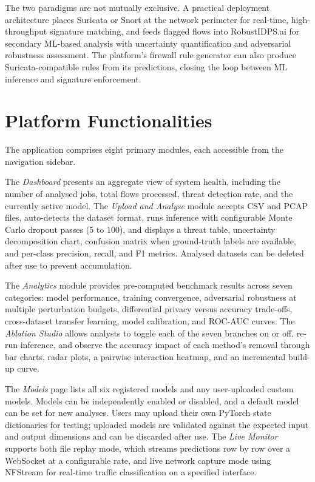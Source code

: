 \documentclass[11pt,a4paper]{article}
\begin{document}
The two paradigms are not mutually exclusive. A practical deployment
architecture places Suricata or Snort at the network perimeter for
real-time, high-throughput signature matching, and feeds flagged flows
into RobustIDPS.ai for secondary ML-based analysis with uncertainty
quantification and adversarial robustness assessment. The platform's
firewall rule generator can also produce Suricata-compatible rules from
its predictions, closing the loop between ML inference and signature
enforcement.

\section{Platform Functionalities}

The application comprises eight primary modules, each accessible from the
navigation sidebar.

The \textit{Dashboard} presents an aggregate view of system health,
including the number of analysed jobs, total flows processed, threat
detection rate, and the currently active model. The \textit{Upload and
Analyse} module accepts CSV and PCAP files, auto-detects the dataset
format, runs inference with configurable Monte Carlo dropout passes (5 to
100), and displays a threat table, uncertainty decomposition chart,
confusion matrix when ground-truth labels are available, and per-class
precision, recall, and F1 metrics. Analysed datasets can be deleted after
use to prevent accumulation.

The \textit{Analytics} module provides pre-computed benchmark results
across seven categories: model performance, training convergence,
adversarial robustness at multiple perturbation budgets, differential
privacy versus accuracy trade-offs, cross-dataset transfer learning, model
calibration, and ROC-AUC curves. The \textit{Ablation Studio} allows
analysts to toggle each of the seven branches on or off, re-run inference,
and observe the accuracy impact of each method's removal through bar
charts, radar plots, a pairwise interaction heatmap, and an incremental
build-up curve.

The \textit{Models} page lists all six registered models and any
user-uploaded custom models. Models can be independently enabled or
disabled, and a default model can be set for new analyses. Users may
upload their own PyTorch state dictionaries for testing; uploaded models
are validated against the expected input and output dimensions and can
be discarded after use. The \textit{Live Monitor} supports both file
replay mode, which streams predictions row by row over a WebSocket at
a configurable rate, and live network capture mode using NFStream for
real-time traffic classification on a specified interface.
\end{document}

